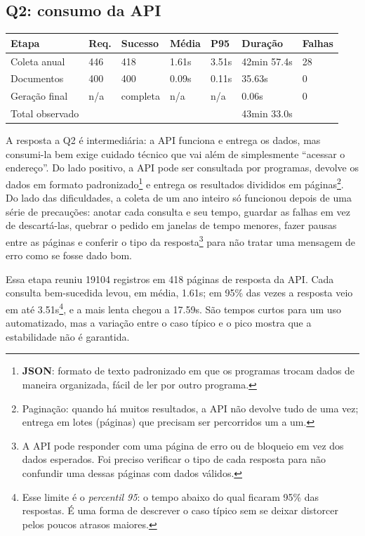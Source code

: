 \documentclass[12pt]{article}
\newcounter{none}
\begin{document}
\subsection{Q2: consumo da API}\label{q2-consumo-da-api}

{\def\LTcaptype{none} %
\begin{longtable}[]{@{}lllllll@{}}
\toprule\noalign{}
Etapa & Req. & Sucesso & Média & P95 & Duração & Falhas \\
\midrule\noalign{}
\endhead
\bottomrule\noalign{}
\endlastfoot
Coleta anual & 446 & 418 & 1.61s & 3.51s & 42min 57.4s & 28 \\
Documentos & 400 & 400 & 0.09s & 0.11s & 35.63s & 0 \\
Geração final & n/a & completa & n/a & n/a & 0.06s & 0 \\
Total observado & & & & & 43min 33.0s & \\
\end{longtable}
}

A resposta a Q2 é intermediária: a API funciona e entrega os dados, mas
consumi-la bem exige cuidado técnico que vai além de simplesmente
``acessar o endereço''. Do lado positivo, a API pode ser consultada por
programas, devolve os dados em formato padronizado\footnote{\textbf{JSON}:
  formato de texto padronizado em que os programas trocam dados de
  maneira organizada, fácil de ler por outro programa.} e entrega os
resultados divididos em páginas\footnote{Paginação: quando há muitos
  resultados, a API não devolve tudo de uma vez; entrega em lotes
  (páginas) que precisam ser percorridos um a um.}. Do lado das
dificuldades, a coleta de um ano inteiro só funcionou depois de uma
série de precauções: anotar cada consulta e seu tempo, guardar as falhas
em vez de descartá-las, quebrar o pedido em janelas de tempo menores,
fazer pausas entre as páginas e conferir o tipo da resposta\footnote{A
  API pode responder com uma página de erro ou de bloqueio em vez dos
  dados esperados. Foi preciso verificar o tipo de cada resposta para
  não confundir uma dessas páginas com dados válidos.} para não tratar
uma mensagem de erro como se fosse dado bom.

Essa etapa reuniu 19104 registros em 418 páginas de resposta da API.
Cada consulta bem-sucedida levou, em média, 1.61s; em 95\% das vezes a
resposta veio em até 3.51s\footnote{Esse limite é o \emph{percentil 95}:
  o tempo abaixo do qual ficaram 95\% das respostas. É uma forma de
  descrever o caso típico sem se deixar distorcer pelos poucos atrasos
  maiores.}, e a mais lenta chegou a 17.59s. São tempos curtos para um
uso automatizado, mas a variação entre o caso típico e o pico mostra que
a estabilidade não é garantida.
\end{document}
